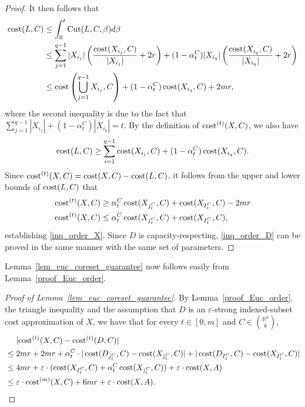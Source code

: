 \documentclass[11pt,letterpaper]{article}
\theoremstyle{definition}
\newtheorem{remark}[theorem]{Remark}
\newcommand{\eps}{\varepsilon}
\newcommand{\R}{\mathbb{R}}
\DeclarePairedDelimiter{\abs}{\lvert}{\rvert}
\begin{document}
\begin{proof}
	It then follows that
	\begin{align*}
		\cost(L,C) 
		&\leq \int_{0}^t \mathrm{Cut}(L,C,\beta) d\beta\\
		&\leq \sum_{j=1}^{q-1} |X_{i_j}| \left(\frac{\cost(X_{i_j},C)}{|X_{i_j}|}+2r\right) + (1 - \alpha_t^C) |X_{i_q}| \left(\frac{\cost(X_{i_q},C)}{|X_{i_q}|}+2r\right)\\
		&\leq \cost\left(\bigcup_{j=1}^{q-1} X_{i_j}, C\right) + (1-\alpha_t^C)\cost(X_{i_q},C)+2mr,
	\end{align*}
	where the second inequality is due to the fact that $\sum_{j=1}^{q-1} |X_{i_j}|+(1-\alpha_t^C)|X_{i_q}|=t$. By the definition of $\cost^{(t)}(X,C)$, we also have
	\[
	\cost(L,C)\geq \sum_{i=1}^{q-1} \cost(X_{i_j},C)+(1-\alpha_t^C)\cost(X_{i_q},C).
	\]
	Since $\cost^{(t)}(X,C)=\cost(X,C)-\cost(L,C)$, it follows from the upper and lower bounds of $\cost(L,C)$ that
	\begin{align*}
		\cost^{(t)}(X,C) &\geq \alpha_t^C \cost(X_{j_t^C},C)+\cost(X_{I_t^C},C)-2mr \\ 
		\cost^{(t)}(X,C) &\leq \alpha_t^C \cost(X_{j_t^C},C)+\cost(X_{I_t^C},C),
	\end{align*}
	establishing \eqref{inq_order_X}. Since $D$ is capacity-respecting, \eqref{inq_order_D} can be proved in the same manner with the same set of parameters.
\end{proof} 

Lemma~\ref{lem_euc_coreset_guarantee} now follows easily from Lemma~\ref{proof_Euc_order}.
\begin{proof}[Proof of Lemma~\ref{lem_euc_coreset_guarantee}]
	By Lemma~\ref{proof_Euc_order}, the triangle inequality and the assumption that $D$ is an $\eps$-strong indexed-subset cost approximation of $X$, we have that for every $t\in [0,m]$ and $C\in \binom{\R^d}{k}$,
	\begin{align*}
		&\quad\ \abs{\cost^{(t)}(X,C)-\cost^{(t)}(D,C)}\\
		&\leq 2mr+2mr+\alpha_t^C\cdot |\cost(D_{j_t^C},C)-\cost(X_{j_t^C},C)|+|\cost(D_{I_t^C},C)-\cost(X_{I_t^C},C)|\\
		&\leq 4mr+\eps\cdot (\cost(X_{I_t^C},C)+\alpha_t^C\cost(X_{j_t^C},C))+\eps\cdot \cost(X,A)\\
		&\leq \eps\cdot \cost^{(m)}(X,C)+6mr+\eps\cdot \cost(X,A). \qedhere
	\end{align*}
\end{proof}

\end{document}
